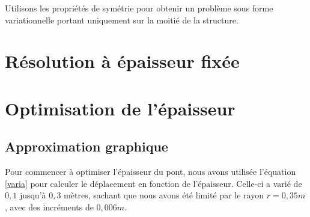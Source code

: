 \documentclass{article}
\begin{document}
    \begin{solution}   
        
    \end{solution}

    \begin{problem}{2}
    Utilisons les propriétés de symétrie pour obtenir un problème sous forme variationnelle portant uniquement sur la moitié de la structure.
    \end{problem}
    
    \begin{solution}   
        
    \end{solution}

    \section{Résolution à épaisseur fixée}
        
    \section{Optimisation de l'épaisseur}

    \subsection{Approximation graphique}
    
    Pour commencer à optimiser l'épaisseur du pont, nous avons utilisée l'équation \ref{varia} pour calculer le déplacement en fonction de l'épaisseur. Celle-ci a varié de $0,1$ jusqu'à $0,3$ mètres, sachant que nous avons été limité par le rayon $r = 0,35 m$, avec des incréments de $0,006 m$.
    
\end{document}
